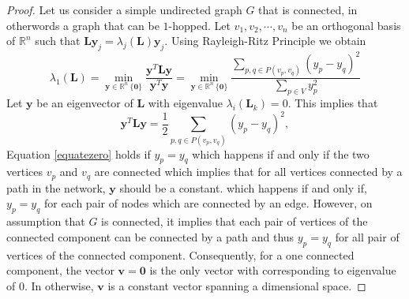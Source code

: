 \documentclass[10pt,a4paper]{article}
\begin{document}
    	    \begin{proof}
    	    	Let us consider a simple undirected graph $G$ that is connected, in otherwords a graph that can be $1$-hopped. Let ${v_1, v_2, \cdots, v_n}$ be an orthogonal basis of $\mathbb{R}^n$ such that $\mathbf{L} \mathbf{y}_j = \lambda_j (\mathbf{L}) \mathbf{y}_j$. Using Rayleigh-Ritz Principle we obtain
    	    	\begin{equation}
    	    	\lambda_1(\mathbf{L}) = \min\limits_{\mathbf{y} \in \mathbb{R}^n \ \{\mathbf{0} \}} \frac{\mathbf{y}^T \mathbf{L} \mathbf{y}}{\mathbf{y}^T \mathbf{y}} =
    	    	\min\limits_{\mathbf{y} \in \mathbb{R}^n \ \{\mathbf{0} \}}
    	    	\frac{\sum_{p,q \in P(v_p,v_q)} (y_p -y_q)^2}{\sum_{p\in V} y_p ^2}
    	    	\end{equation}
    	    	Let $\mathbf{y}$ be an eigenvector of $\mathbf{L}$ with eigenvalue $\lambda_i(\mathbf{L}_k)=0$. This implies that
    	    	\begin{equation}
    	    	\mathbf{y}^T \mathbf{L} \mathbf{y} = \frac{1}{2} \sum_{p,q \in P(v_p,v_q)} (y_p-y_q)^2 , 
    	    	\label{equatezero} 
    	    	\end{equation}
    	    	Equation \ref{equatezero} holds if $y_p = y_q$ which happens if and only if the two vertices $v_p$ and $v_q$ are connected which implies that for all vertices connected by a path in the network, $\mathbf{y}$ should be a constant.
    	    	which happens if and only if, $y_p =y_q$ for each pair of nodes which are connected by an edge. However, on assumption that $G$ is connected, it implies that each pair of vertices of the connected component can be connected by a path and thus $y_p =y_q$ for all pair of vertices of the connected component. Consequently, for a one connected component, the vector $\mathbf{v}= \mathbf{0}$ is the only vector with corresponding to eigenvalue of $0$. In otherwise, $\mathbf{v}$ is a constant vector spanning a dimensional space. 
    	    	

\end{proof}
\end{document}
